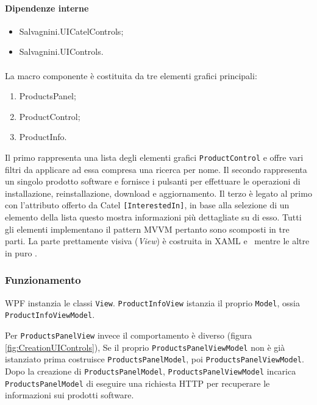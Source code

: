 \documentclass[../RelazioneFinale.tex]{subfiles}
\begin{document}
				\paragraph{Dipendenze interne}
					\begin{itemize}
						\item Salvagnini.UICatelControls;
						\item Salvagnini.UIControls.
					\end{itemize}
					
				\paragraph{}							
			La macro componente è costituita da tre elementi grafici principali: 
			\begin{enumerate}
				\item ProductsPanel;
				\item ProductControl;
				\item ProductInfo.
			\end{enumerate}
			
			Il primo rappresenta una lista degli elementi grafici \verb|ProductControl| e offre vari filtri da applicare ad essa compresa una ricerca per nome.
			Il secondo rappresenta un singolo prodotto software e fornisce i pulsanti per effettuare le operazioni di installazione, reinstallazione, download e aggiornamento.
			Il terzo è legato al primo con l'attributo offerto da Catel \verb|[InterestedIn]|, in base alla selezione di un elemento della lista questo mostra informazioni più dettagliate su di esso.
			Tutti gli elementi implementano il pattern MVVM pertanto sono scomposti in tre parti. La parte prettamente visiva (\emph{View}) è costruita in XAML e \Csharp\ mentre le altre in puro \Csharp.
						
			\subsubsection{Funzionamento}
				WPF instanzia le classi \verb|View|. \verb|ProductInfoView| istanzia il proprio \verb|Model|, ossia \verb|ProductInfoViewModel|.
				
				Per \verb|ProductsPanelView| invece il comportamento è diverso (figura \ref{fig:CreationUIControls}), Se il proprio \verb|ProductsPanelViewModel| non è già istanziato prima costruisce \verb|ProductsPanelModel|, poi \verb|ProductsPanelViewModel|. Dopo la creazione di \verb|ProductsPanelModel|, \verb|ProductsPanelViewModel| incarica \verb|ProductsPanelModel| di eseguire una richiesta HTTP per recuperare le informazioni sui prodotti software.
				
\end{document}
